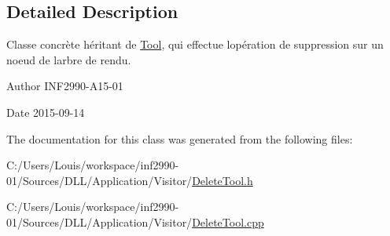 \subsection{Detailed Description}
Classe concrète héritant de \hyperlink{class_tool}{Tool}, qui effectue l\textquotesingle{}opération de suppression sur un noeud de l\textquotesingle{}arbre de rendu. 

\begin{DoxyAuthor}{Author}
I\+N\+F2990-\/\+A15-\/01 
\end{DoxyAuthor}
\begin{DoxyDate}{Date}
2015-\/09-\/14 
\end{DoxyDate}


The documentation for this class was generated from the following files\+:\begin{DoxyCompactItemize}
\item 
C\+:/\+Users/\+Louis/workspace/inf2990-\/01/\+Sources/\+D\+L\+L/\+Application/\+Visitor/\hyperlink{_delete_tool_8h}{Delete\+Tool.\+h}\item 
C\+:/\+Users/\+Louis/workspace/inf2990-\/01/\+Sources/\+D\+L\+L/\+Application/\+Visitor/\hyperlink{_delete_tool_8cpp}{Delete\+Tool.\+cpp}\end{DoxyCompactItemize}
